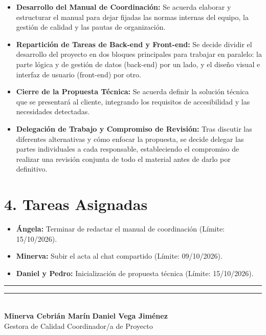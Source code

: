 \begin{itemize}
    \item \textbf{Desarrollo del Manual de Coordinación:} 
    Se acuerda elaborar y estructurar el manual para dejar fijadas las normas internas del equipo, la gestión de calidad y las pautas de organización.

    \item \textbf{Repartición de Tareas de Back-end y Front-end:} 
    Se decide dividir el desarrollo del proyecto en dos bloques principales para trabajar en paralelo: la parte lógica y de gestión de datos (back-end) por un lado, y el diseño visual e interfaz de usuario (front-end) por otro.

    \item \textbf{Cierre de la Propuesta Técnica:} 
    Se acuerda definir la solución técnica que se presentará al cliente, integrando los requisitos de accesibilidad y las necesidades detectadas.

    \item \textbf{Delegación de Trabajo y Compromiso de Revisión:} 
    Tras discutir las diferentes alternativas y cómo enfocar la propuesta, se decide delegar las partes individuales a cada responsable, estableciendo el compromiso de realizar una revisión conjunta de todo el material antes de darlo por definitivo.
\end{itemize}

\section*{4. Tareas Asignadas}
\begin{itemize}
    \item \textbf{Ángela:} Terminar de redactar el manual de coordinación (Límite: 15/10/2026).
    \item \textbf{Minerva:} Subir el acta al chat compartido (Límite: 09/10/2026).
     \item \textbf{Daniel y Pedro:} Inicialización de propuesta técnica (Límite: 15/10/2026).
\end{itemize}

\noindent
\rule{6cm}{0.4pt} \hfill \rule{6cm}{0.4pt}\\
\textbf{Minerva Cebrián Marín} \hfill \textbf{Daniel Vega Jiménez}\\
Gestora de Calidad \hfill Coordinador/a de Proyecto
